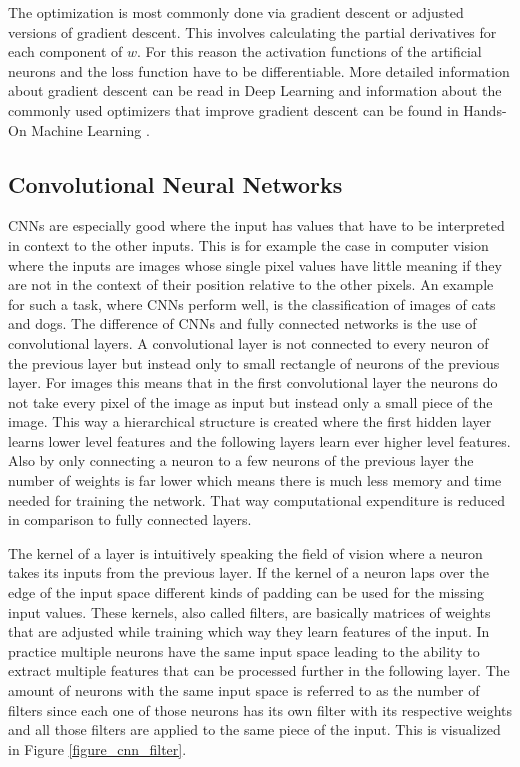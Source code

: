 The optimization is most commonly done via gradient descent or adjusted versions of gradient descent.
This involves calculating the partial derivatives for each component of $w$.
For this reason the activation functions of the artificial neurons and the loss function have to be
differentiable. More detailed information about gradient descent can be read in Deep Learning
\parencite{2016-goodfellow-deep} and information about the commonly used optimizers that improve 
gradient descent can be found in Hands-On Machine Learning \parencite{2017-geron-homl}.

\subsection{Convolutional Neural Networks}

CNNs are especially good where the input has values that have to be interpreted in context to the other
inputs. This is for example the case in computer vision where the inputs are images whose
single pixel values have little
meaning if they are not in the context of their position relative to the other pixels. An example for
such a task, where CNNs perform well, is the classification of images of cats and dogs.
The difference of CNNs and fully connected networks is the use of convolutional layers.
A convolutional layer is not connected to every neuron of the previous layer but instead only to small
rectangle of neurons of the previous layer. For images this means that in the first convolutional layer
the neurons do not take every pixel of the image as input but instead only a small piece of the image.
This way a hierarchical structure is created where the first hidden layer learns lower level features
and the following layers learn ever higher level features. Also by only connecting a neuron to a few
neurons of the previous layer the number of weights is far lower which means there is much less memory
and time needed for training the network. That way computational expenditure is reduced in comparison
to fully connected layers.

The kernel of a layer is intuitively speaking the field of vision where a neuron takes its inputs from
the previous layer. If the kernel of a neuron laps over the edge
of the input space different kinds of padding can be used for the missing input values.
These kernels, also called filters, are basically matrices of weights that are
adjusted while training which way they learn features of the input. In practice multiple neurons have
the same input space leading to the ability to extract multiple features that can be processed
further in the following layer. The amount of neurons with the same input space is referred to as
the number of filters since each one of those neurons has its own filter with its respective
weights and all those filters are applied to the same piece of the input. This is visualized in
Figure \ref{figure_cnn_filter}.

